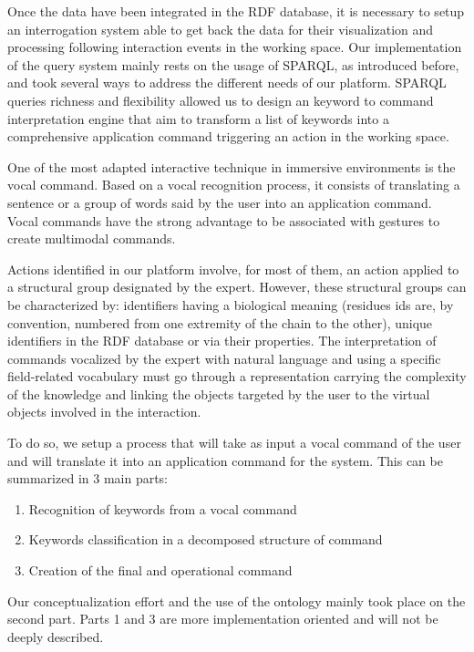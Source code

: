 \documentclass{vgtc}                          %
\begin{document}
Once the data have been integrated in the RDF database, it is necessary to setup an interrogation system able to get back the data for their visualization and processing following interaction events in the working space. Our implementation of the query system mainly rests on the usage of SPARQL, as introduced before, and took several ways to address the different needs of our platform. SPARQL queries richness and flexibility allowed us to design an keyword to command interpretation engine that aim to transform a list of keywords into a comprehensive application command triggering an action in the working space.

One of the most adapted interactive technique in immersive environments is the vocal command. Based on a vocal recognition process, it consists of translating a sentence or a group of words said by the user into an application command. Vocal commands have the strong advantage to be associated with gestures to create multimodal commands.

Actions identified in our platform involve, for most of them, an action applied to a structural group designated by the expert. However, these structural groups can be characterized by: identifiers having a biological meaning (residues ids are, by convention, numbered from one extremity of the chain to the other), unique identifiers in the RDF database or via their properties.
The interpretation of commands vocalized by the expert with natural language and using a specific field-related vocabulary must go through a representation carrying the complexity of the knowledge and linking the objects targeted by the user to the virtual objects involved in the interaction.

To do so, we setup a process that will take as input a vocal command of the user and will translate it into an application command for the system. This can be summarized in 3 main parts:

\begin{enumerate}
  \item Recognition of keywords from a vocal command
  \item Keywords classification in a decomposed structure of command
  \item Creation of the final and operational command
\end{enumerate}

Our conceptualization effort and the use of the ontology mainly took place on the second part. Parts 1 and 3 are more implementation oriented and will not be deeply described.
\end{document}
